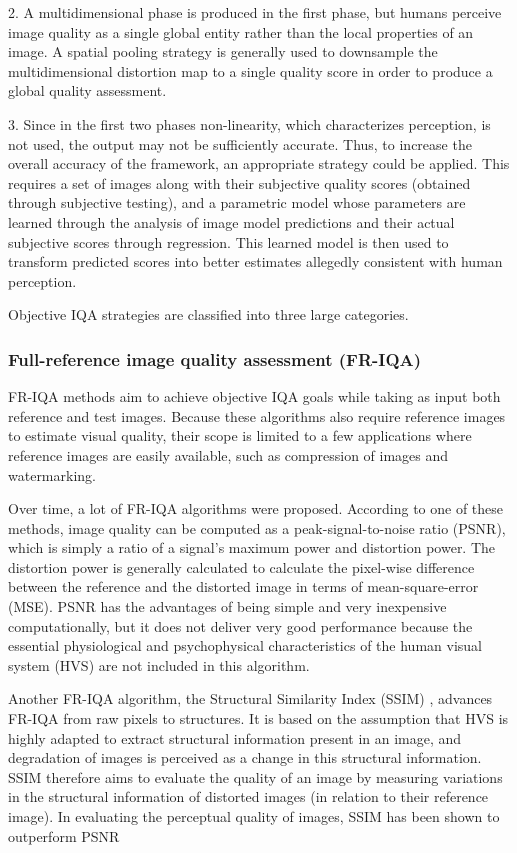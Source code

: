 2. A multidimensional phase is produced in the first phase, but humans perceive image quality as a single global entity rather than the local properties of an image. A spatial pooling strategy is generally used to downsample the multidimensional distortion map to a single quality score in order to produce a global quality assessment. \cite{Wang2006}

3. Since in the first two phases non-linearity, which characterizes perception, is not used, the output may not be sufficiently accurate. Thus, to increase the overall accuracy of the framework, an appropriate strategy could be applied. This requires a set of images along with their subjective quality scores (obtained through subjective testing), and a parametric model whose parameters are learned through the analysis of image model predictions and their actual subjective scores through regression. This learned model is then used to transform predicted scores into better estimates allegedly consistent with human perception. 

Objective IQA strategies are classified into three large categories.

\subsubsection{Full-reference image quality assessment (FR-IQA)}

FR-IQA methods aim to achieve objective IQA goals while taking as input both reference and test images. Because these algorithms also require reference images to estimate visual quality, their scope is limited to a few applications where reference images are easily available, such as compression of images and watermarking. 

Over time, a lot of FR-IQA algorithms were proposed. According to one of these methods, image quality can be computed as a peak-signal-to-noise ratio (PSNR), which is simply a ratio of a signal's maximum power and distortion power. The distortion power is generally calculated to calculate the pixel-wise difference between the reference and the distorted image in terms of mean-square-error (MSE). PSNR has the advantages of being simple and very inexpensive computationally, but it does not deliver very good performance because the essential physiological and psychophysical characteristics of the human visual system (HVS) are not included in this algorithm. 

Another FR-IQA algorithm, the Structural Similarity Index (SSIM) \cite{Wang2004}, advances FR-IQA from raw pixels to structures. It is based on the assumption that HVS is highly adapted to extract structural information present in an image, and degradation of images is perceived as a change in this structural information. SSIM therefore aims to evaluate the quality of an image by measuring variations in the structural information of distorted images (in relation to their reference image). In evaluating the perceptual quality of images, SSIM has been shown to outperform PSNR 

